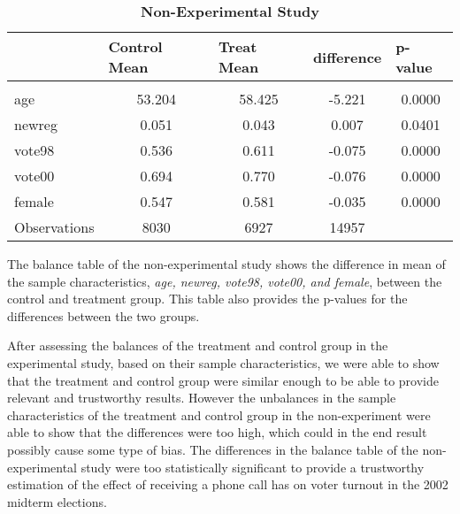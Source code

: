 \documentclass[a4paper]{article}
\begin{document}
\begin{table}[htbp]\centering
\caption{\textbf{Non-Experimental Study}}
\begin{tabular}{|l|c|c|c|c|}
\hline
             & \multicolumn{1}{l|}{Control Mean} & \multicolumn{1}{l|}{Treat Mean} & \multicolumn{1}{l|}{difference} & \multicolumn{1}{l|}{p-value} \\ \hline
             &                                   &                                 &                                 &                              \\ \hline
age          & 53.204                            & 58.425                          & -5.221                          & 0.0000                       \\ \hline
newreg       & 0.051                             & 0.043                           & 0.007                           & 0.0401                       \\ \hline
vote98       & 0.536                             & 0.611                           & -0.075                          & 0.0000                       \\ \hline
vote00       & 0.694                             & 0.770                           & -0.076                          & 0.0000                       \\ \hline
female       & 0.547                             & 0.581                           & -0.035                          & 0.0000                       \\ \hline
Observations & 8030                              & 6927                            & 14957                           &                              \\ \hline
\end{tabular}
\vspace{1ex}
\newline
\RaggedRight The balance table of the non-experimental study shows the difference in mean of the sample characteristics, \textit{age, newreg, vote98, vote00, and female}, between the control and treatment group. This table also provides the p-values for the differences between the two groups.
\end{table}

\begin{flushleft}
After assessing the balances of the treatment and control group in the experimental study, based on their sample characteristics, we were able to show that the treatment and control group were similar enough to be able to provide relevant and trustworthy results. However the unbalances in the sample characteristics of the treatment and control group in the non-experiment were able to show that the differences were too high, which could in the end result possibly cause some type of bias. The differences in the balance table of the non-experimental study were too statistically significant to provide a trustworthy estimation of the effect of receiving a phone call has on voter turnout in the 2002 midterm elections.
\end{flushleft}
\end{document}

